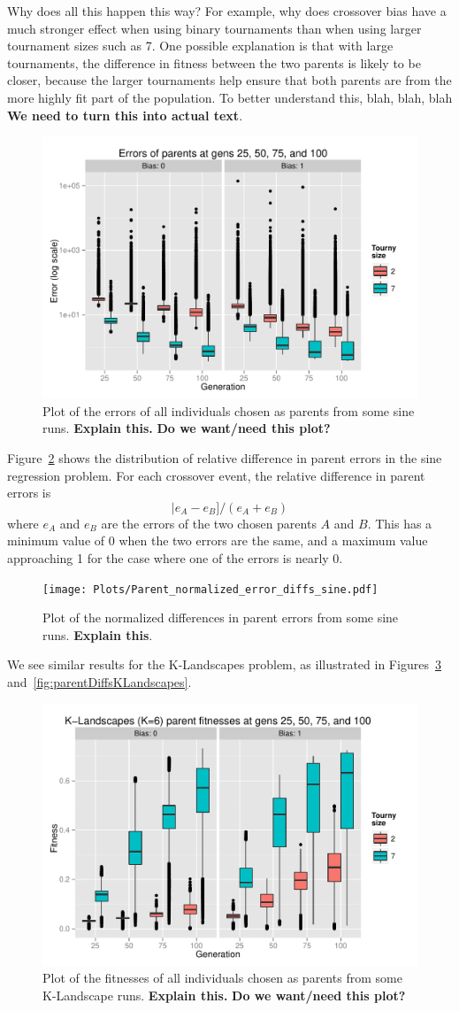 \documentclass{sig-alternate}
\begin{document}
Why does all this happen this way? For example, why does crossover bias have a much stronger effect when using 
binary tournaments than when using larger tournament sizes such as 7. One possible explanation is that with large 
tournaments, the difference in fitness between the two parents is likely to be closer, because the larger tournaments 
help ensure that both parents are from the more highly fit part of the population. To better understand this, blah, blah, 
blah \textbf{We need to turn this into actual text}.

\begin{figure}
\centering
\includegraphics[width=0.45 \textwidth]{Plots/Parent_errors_sine.pdf}
\caption{Plot of the errors of all individuals chosen as parents from some sine runs. \textbf{Explain this.} \textbf{Do we want/need this plot?}}
\label{fig:parentErrorsSine}
\end{figure}

Figure~\ref{fig:parentDiffsSine} shows the distribution of relative difference in parent errors in the sine regression 
problem. For each crossover event, the relative difference in parent errors is
\[
	|e_A - e_B] / (e_A + e_B)
\]
where $e_A$ and $e_B$ are the errors of the two chosen parents $A$ and $B$. This has a minimum value of 0 when 
the two errors are the same, and a maximum value approaching 1 for the case where one of the errors is nearly 0.

\begin{figure}
\centering
\texttt{[image: Plots/Parent\_normalized\_error\_diffs\_sine.pdf]}
\caption{Plot of the normalized differences in parent errors from some sine runs. \textbf{Explain this}.}
\label{fig:parentDiffsSine}
\end{figure}

We see similar results for the K-Landscapes problem, as illustrated in Figures~\ref{fig:parentFitnessesKLandscapes} and~\ref{fig:parentDiffsKLandscapes}.

\begin{figure}
\centering
\includegraphics[width=0.45 \textwidth]{Plots/Parent_fitnesses_KLandscapes.pdf}
\caption{Plot of the fitnesses of all individuals chosen as parents from some K-Landscape runs. \textbf{Explain this.} \textbf{Do we want/need this plot?}}
\label{fig:parentFitnessesKLandscapes}
\end{figure}
\end{document}
